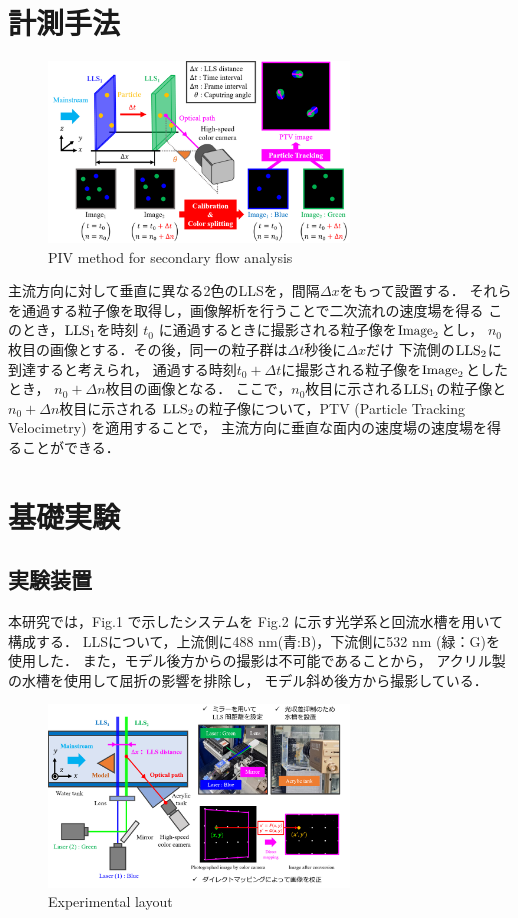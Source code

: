 \documentclass[twocolumn,a4j]{jsarticle}
\begin{document}
\section{計測手法}
\begin{figure}[htbp]
  \centering
  \includegraphics[keepaspectratio, width=80mm]{../images/PIVMethodforSecondaryFlow.png}
  \caption{PIV method for secondary flow analysis}
\end{figure}

主流方向に対して垂直に異なる2色のLLSを，間隔$\Delta x$をもって設置する．
それらを通過する粒子像を取得し，画像解析を行うことで二次流れの速度場を得る
このとき，$\rm{LLS}_1$を時刻 $t_0$ に通過するときに撮影される粒子像を$\rm{Image}_2$とし，
$n_0$ 枚目の画像とする．その後，同一の粒子群は$\Delta t$秒後に$\Delta x$だけ
下流側の$\rm{LLS}_2$に到達すると考えられ，
通過する時刻$t_0 + \Delta t$に撮影される粒子像を$\rm{Image}_2$としたとき，
$n_0 + \Delta n$枚目の画像となる．
ここで，$n_0$枚目に示される$\rm{LLS}_1$の粒子像と$n_0 + \Delta n$枚目に示される
$\rm{LLS}_2$の粒子像について，PTV (Particle Tracking Velocimetry) を適用することで，
主流方向に垂直な面内の速度場の速度場を得ることができる．

\setcounter{section}{3}
\section{基礎実験}
\subsection{実験装置}
本研究では，Fig.1 で示したシステムを Fig.2 に示す光学系と回流水槽を用いて構成する．
LLSについて，上流側に488 nm(青:B)，下流側に532 nm (緑：G)を使用した．
また，モデル後方からの撮影は不可能であることから，
アクリル製の水槽を使用して屈折の影響を排除し，
モデル斜め後方から撮影している．\\

\begin{figure}[htbp]
  \centering
  \includegraphics[keepaspectratio, width=80mm]{../images/ExperimentalLayout.png}
  \caption{Experimental layout}
\end{figure}
\end{document}
